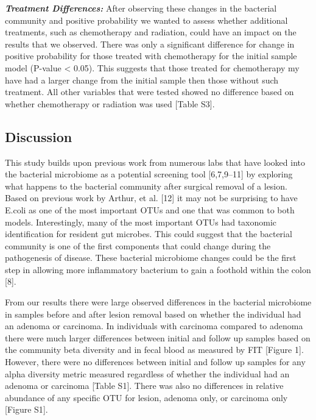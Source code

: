 \documentclass[12pt,]{article}
\begin{document}
\textbf{\emph{Treatment Differences:}} After observing these changes in
the bacterial community and positive probability we wanted to assess
whether additional treatments, such as chemotherapy and radiation, could
have an impact on the results that we observed. There was only a
significant difference for change in positive probability for those
treated with chemotherapy for the initial sample model (P-value
\textless{} 0.05). This suggests that those treated for chemotherapy my
have had a larger change from the initial sample then those without such
treatment. All other variables that were tested showed no difference
based on whether chemotherapy or radiation was used {[}Table S3{]}.

\newpage

\subsection{Discussion}\label{discussion}

This study builds upon previous work from numerous labs that have looked
into the bacterial microbiome as a potential screening tool
{[}6,7,9--11{]} by exploring what happens to the bacterial community
after surgical removal of a lesion. Based on previous work by Arthur, et
al. {[}12{]} it may not be surprising to have E.coli as one of the most
important OTUs and one that was common to both models. Interestingly,
many of the most important OTUs had taxonomic identification for
resident gut microbes. This could suggest that the bacterial community
is one of the first components that could change during the pathogenesis
of disease. These bacterial microbiome changes could be the first step
in allowing more inflammatory bacterium to gain a foothold within the
colon {[}8{]}.

From our results there were large observed differences in the bacterial
microbiome in samples before and after lesion removal based on whether
the individual had an adenoma or carcinoma. In individuals with
carcinoma compared to adenoma there were much larger differences between
initial and follow up samples based on the community beta diversity and
in fecal blood as measured by FIT {[}Figure 1{]}. However, there were no
differences between initial and follow up samples for any alpha
diversity metric measured regardless of whether the individual had an
adenoma or carcinoma {[}Table S1{]}. There was also no differences in
relative abundance of any specific OTU for lesion, adenoma only, or
carcinoma only {[}Figure S1{]}.
\end{document}
